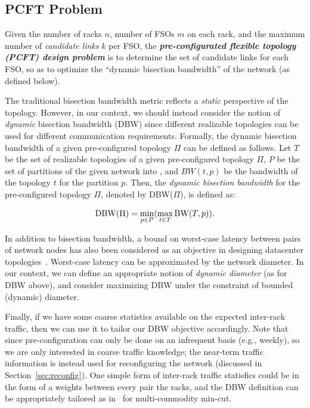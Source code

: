 \subsection{PCFT Problem}

Given the number of racks $n$, number of FSOs $m$ on each rack, and
the maximum number of {\em candidate links} $k$ per FSO, the {\bf {\em
    pre-configurated flexible topology (PCFT) design problem}} is to
determine the set of candidate links for each FSO, so as to optimize
the ``dynamic bisection bandwidth'' of the network (as defined below).

  The
traditional bisection bandwidth metric reflects a {\em static}
perspective of the topology. However, in our context, we should
instead consider the notion of {\em dynamic} bisection bandwidth (DBW)
since different realizable topologies can be used for different
communication requirements. Formally, the dynamic bisection bandwidth
of a given pre-configured topology $\Pi$ can be defined as
follows. Let $T$ be the set of realizable topologies of a given
pre-configured topology $\Pi$, $P$ be the set of partitions of the
given network into , and
$BW(t,p)$ be the bandwidth of the topology $t$ for the partition $p$.
Then, the {\em dynamic bisection bandwidth} for the pre-configured
topology $\Pi$, denoted by DBW($\Pi$), is defined as:

$${\rm DBW}(\Pi)  = \min_{p \in P} (\max_{t \in T} {\rm BW}(T, p)).$$

In addition to bisection bandwidth, a bound on worst-case latency
between pairs of network nodes has also been considered as an
objective in designing datacenter topologies~\cite{rewire-20-39}.
Worst-case latency can be approximated by the network diameter. In our
context, we can define an appropriate notion of {\em dynamic diameter}
(as for DBW above), and consider maximizing DBW under the constraint
of bounded (dynamic) diameter.

Finally, if we have some coarse statistics available on the expected
inter-rack traffic, then we can use it to tailor our DBW objective
accordingly. Note that since pre-configuration can only be done on an
infrequent basis (e.g., weekly), so we are only interested in coarse
traffic knowledge; the near-term traffic information is instead used
for reconfiguring the network (discussed in
Section~\ref{sec:reconfig}). One simple form of inter-rack traffic
statisfics could be in the form of a weights between every pair the
racks, and the DBW definition can be appropriately tailored as
in~\cite{leighton-99} for multi-commodity min-cut. 

